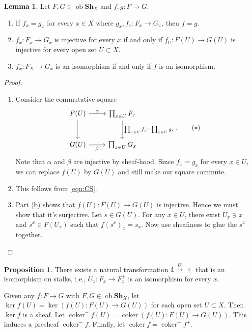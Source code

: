 \documentclass[10pt,letterpaper,cm]{nupset}
\theoremstyle{definition}
\theoremstyle{theorem}
\newtheorem{lemma}[definition]{Lemma}
\newtheorem{prop}[definition]{Proposition}
\theoremstyle{remark}
\newcommand{\1}{\mathbb{1}}
\newcommand{\0}{\vec 0}
\DeclareMathOperator{\ob}{ob}
\DeclareMathOperator{\coker}{coker}
\begin{document}
\begin{lemma}
Let $F, G \in \ob{\mathbf{Sh}_{X}}$ and $f,g : F \to G$. 
\begin{enumerate}[label=(\alph*)]
\item If $f_x = g_x$ for every $x \in X$ where $g_x, f_x : F_x \to G_x$, then $f =g$.
\item $f_x : F_x \to G_x$ is injective for every $x$ if and only if $f_U : F(U) \to G(U)$ is injective for every open set $U \subset X$.
\item $f_x : F_X \to G_x$ is an isomorphism if and only if $f$ is an isomorphism.
\end{enumerate}
\end{lemma}
\begin{proof} $ $
\begin{enumerate}[label=(\alph*)]
\item Consider the commutative square 
\[ \label{eqn:CS}
\begin{tikzcd}[row sep=large]
F(U) \arrow[r, "\alpha"] \arrow[d] & \prod_{x\in U}F_x \arrow[d, "\prod_{x \in U}f_x = \prod_{x \in U} g_x "] \\
G(U) \arrow[r, "\beta"']           & \prod_{x \in U} G_x                                                     
\end{tikzcd}
.\tag{$\ast$}\]  
Note that $\alpha$ and $\beta$ are injective by sheaf-hood. Since $f_x = g_x$ for every $x\in U$, we can replace $f(U)$ by $G(U)$ and still make our square commute.
\item This follows from \eqref{eqn:CS}.
\item Part (b) shows that $f(U) : F(U) \to G(U)$ is injective. Hence we must show that it's surjective. Let $s \in G(U)$. For any $x \in U$, there exist $U_x \ni x$ and $s^x \in F(U_x)$ such that $f(s^x)_x = s_x$. Now use sheafiness to glue the $s^x$ together.
\end{enumerate}
\end{proof}

\begin{prop}
There exists a natural transformation  $\1 \overset{U}{\longrightarrow} +$ that is an isomorphism on stalks, i.e., $U_x : F_x \to F_x^{+}$ is an isomorphism for every $x$.
\end{prop}

\smallskip

Given any $f : F \to G$ with $F, G \in \ob{\mathbf{Sh}_{X}}$, let $\ker{f}(U) = \ker(f(U) : F(U) \to G(U))$ for each open set $U\subset X$. Then $\ker{f}$ is a sheaf. Let $\coker^{-}{f}(U) = \coker(f(U) : F(U) \to G(U))$. This induces a presheaf $\coker^{-}{f}$. Finally, let $\coker{f} = {\coker^{-}{f}}^{+}$.
\end{document}
